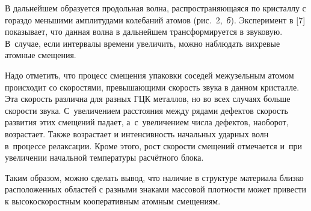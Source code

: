 В дальнейшем образуется продольная волна, распространяющаяся по кристаллу с 
гораздо меньшими амплитудами колебаний атомов (рис.~2,~{\sl б}\/). Эксперимент в [7] 
показывает, что данная волна в дальнейшем трансформируется в звуковую. 
В~случае, если интервалы времени увеличить, можно наблюдать вихревые 
атомные смещения.

Надо отметить, что процесс смещения упаковки соседей межузельным атомом 
происходит со скоростями, превышающими скорость звука в данном кристалле. 
Эта скорость различна для разных ГЦК металлов, но во всех случаях больше 
скорости звука. С~увеличением расстояния между рядами дефектов скорость 
развития этих смещений падает, а~с~увеличением числа дефектов, наоборот, 
возрастает. Также возрастает и интенсивность начальных ударных волн 
в~процессе релаксации. Кроме этого, рост скорости смещений отмечается и~при 
увеличении начальной температуры расчётного блока.

Таким образом, можно сделать вывод, что наличие в структуре материала близко 
расположенных областей с разными знаками массовой плотности может привести к 
высокоскоростным кооперативным атомным смещениям. 



 

